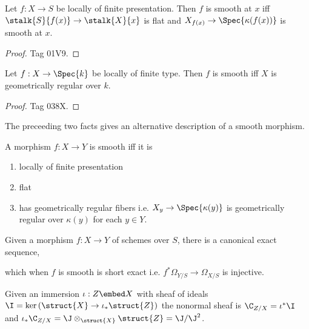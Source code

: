 \documentclass[12pt]{article}
\begin{document}
\begin{lemma}
Let $f : X \to S$ be locally of finite presentation. Then $f$ is smooth at $x$ iff $\stalk{S}{f(x)} \to \stalk{X}{x}$ is flat and $X_{f(x)} \to \Spec{\kappa(f(x))}$ is smooth at $x$.
\end{lemma}

\begin{proof}
Tag 01V9.
\end{proof}

\begin{lemma}
Let $f : X \to \Spec{k}$ be locally of finite type. Then $f$ is smooth iff $X$ is geometrically regular over $k$. 
\end{lemma}

\begin{proof}
Tag 038X.
\end{proof}

\begin{rmk}
The preceeding two facts gives an alternative description of a smooth morphism.
\end{rmk}

\begin{prop}
A morphism $f : X \to Y$ is smooth iff it is
\begin{enumerate}
\item locally of finite presentation
\item flat
\item has geometrically regular fibers i.e. $X_y \to \Spec{\kappa(y)}$ is geometrically regular over $\kappa(y)$ for each $y \in Y$. 
\end{enumerate}
\end{prop}

\begin{prop}
Given a morphism $f : X \to Y$ of schemes over $S$, there is a canonical exact sequence,
\begin{center}
\end{center}
which when $f$ is smooth is short exact i.e. $f^* \Omega_{Y/S} \to \Omega_{X/S}$ is injective.
\end{prop}

\begin{defn}
Given an immersion $\iota : Z \embed X$ with sheaf of ideals $\I = \ker{(\struct{X} \to \iota_* \struct{Z})}$ the nonormal sheaf is $\C_{Z/X} = \iota^* \I$ and $\iota_* \C_{Z/X} = \J \otimes_{\struct{X}} \struct{Z} = \J / \J^2$.
\end{defn}
\end{document}
